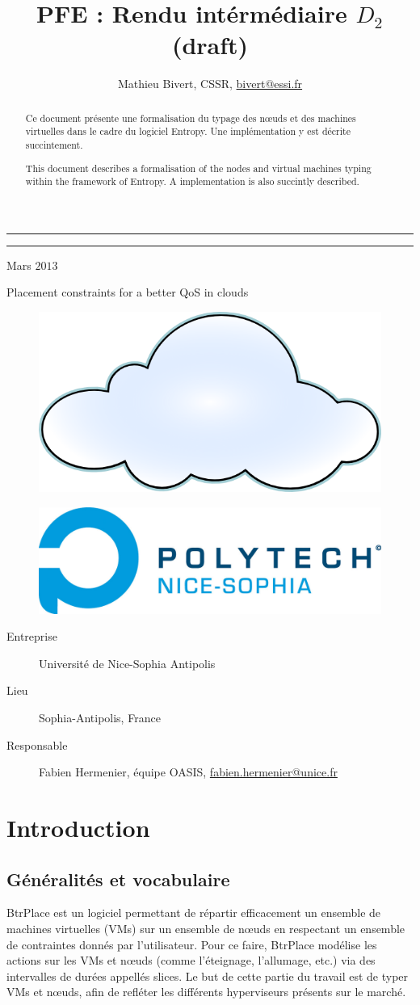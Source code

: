 \documentclass[a4paper]{article}
\author{Mathieu Bivert, CSSR, \href{mailto:bivert@essi.fr}{bivert@essi.fr}}
\title{PFE : Rendu intérmédiaire $D_2$ (draft)}
\makeatletter
\def\maketitle{%
  \null
  \thispagestyle{empty}%
  \vskip 1cm
  \begin{flushright}
        \normalfont\Large\@author
  \end{flushright}
  \vfil
  \hrule height 2pt
  \par
  \begin{center}
        \huge \strut \@title \par
  \end{center}
  \hrule height 2pt
  \begin{center}
  		Mars $2013$
  \end{center}
  \par
  \vfil
  \vfil
  \null
\begin{center}
\Huge{Placement constraints for a better QoS in clouds}
\end{center}
\begin{figure}[!ht]
	\centering
	\includegraphics[scale=.45]{imgs/cloud.png}
\end{figure}
\vfil
\begin{figure}[!ht]
	\centering
	\includegraphics[scale=.5]{imgs/polytech.png}
\end{figure}
\vfil
\begin{description}
	\item[Entreprise] Université de Nice-Sophia Antipolis
	\item[Lieu] Sophia-Antipolis, France
	\item[Responsable] Fabien Hermenier, équipe OASIS,
		\href{mailto:fabien.hermenier@unice.fr}{fabien.hermenier@unice.fr}
\end{description}
\cleardoublepage
}
\makeatother
\begin{document}
\maketitle

	\begin{abstract}
		Ce document présente une formalisation du typage des nœuds
		et des machines virtuelles dans le cadre du logiciel Entropy.
		Une implémentation y est décrite succintement.
	\end{abstract}

	\begin{abstract}
		This document describes a formalisation of the nodes and virtual
		machines typing within the framework of Entropy. A implementation
		is also succintly described.
	\end{abstract}


\tableofcontents
\newpage

\section{Introduction}
\subsection{Généralités et vocabulaire}
BtrPlace est un logiciel permettant de répartir efficacement un ensemble
de machines virtuelles (VMs) sur un ensemble de nœuds en respectant un ensemble
de contraintes donnés par l'utilisateur. Pour ce faire, BtrPlace modélise les
actions sur les VMs et nœuds (comme l'éteignage, l'allumage, etc.) via des intervalles
de durées appellés slices. Le but de cette partie du travail est de typer VMs et nœuds, afin de refléter les différents hyperviseurs présents sur le marché.
\end{document}
